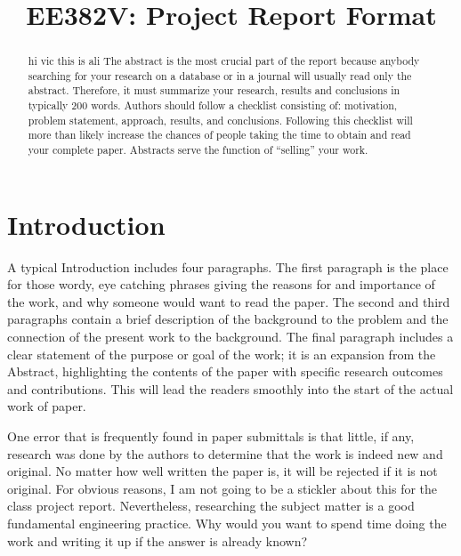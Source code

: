 \documentclass[conference]{IEEEtran}
\begin{document}
\title{EE382V: Project Report Format}

\author{
\and
{}
\and
{}
}

\maketitle

\begin{abstract}
hi vic this is ali
The abstract is the most crucial part of the report because anybody searching for your research on a database or in a journal will usually read only the abstract. Therefore, it must summarize your research, results and conclusions in typically 200 words.  Authors should follow a checklist consisting of: motivation, problem statement, approach, results, and conclusions. Following this checklist will more than likely increase the chances of people taking the time to obtain and read your complete paper. Abstracts serve the function of ``selling'' your work.

\end{abstract}

\section{Introduction}

A typical Introduction includes four paragraphs. The first paragraph is the place for those wordy, eye catching phrases giving the reasons for and importance of the work, and why someone would want to read the paper. The second and third paragraphs contain a brief description of the background to the problem and the connection of the present work to the background. The final paragraph includes a clear statement of the purpose or goal of the work; it is an expansion from the Abstract, highlighting the contents of the paper with specific research outcomes and contributions. This will lead the readers smoothly into the start of the actual work of paper.

One error that is frequently found in paper submittals is that little, if any, research was done by the authors to determine that the work is indeed new and original. No matter how well written the paper is, it will be rejected if it is not original. For obvious reasons, I am not going to be a stickler about this for the class project report. ­Nevertheless, researching the subject matter is a good fundamental engineering practice. Why would you want to spend time doing the work and writing it up if the answer is already known?
\end{document}
